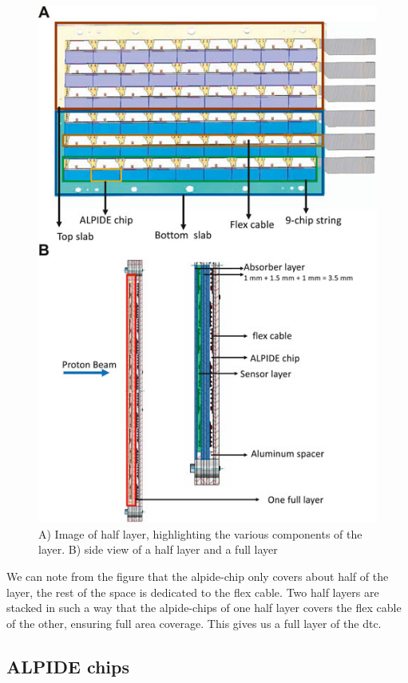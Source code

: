 \documentclass[main.tex]{subfiles}
\begin{document}
\begin{figure}[!ht]
    \centering
    \includegraphics[scale = 0.5]{images/half_layer.jpg}
    \caption{A) Image of half layer, highlighting the various components of the layer. B) side view of a half layer and a full layer\cite{pct_project}}
    \label{fig: half_layer}
\end{figure}
\FloatBarrier

We can note from the figure that the \gls{alpide}-chip only covers about half of the layer, the rest of the space is dedicated to the flex cable. Two half layers are stacked in such a way that the \gls{alpide}-chips of one half layer covers the flex cable of the other, ensuring full area coverage. This gives us a full layer of the \gls{dtc}.


\subsection{ALPIDE chips}
\end{document}
